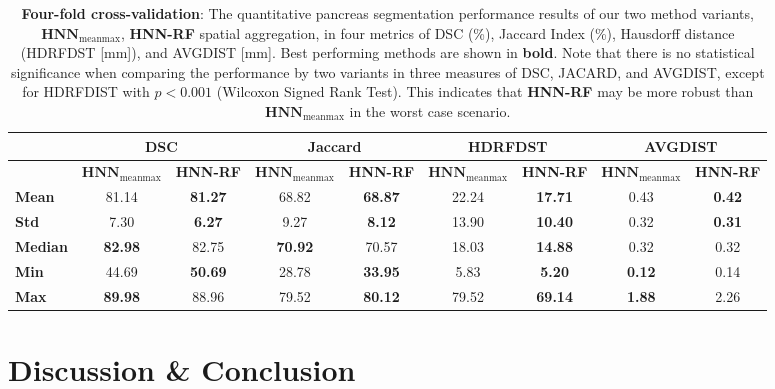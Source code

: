 \documentclass[journal]{IEEEtran}
\begin{document}
\begin{table*}[htb]
\begin{center}
\caption{\small \textbf{Four-fold cross-validation}: The quantitative pancreas segmentation performance results of our two method variants, $\mathbf{HNN}_\mathrm{meanmax}$, \textbf{HNN-RF} spatial aggregation, in four metrics of DSC (\%), Jaccard Index (\%), Hausdorff distance (HDRFDST [mm]), and AVGDIST [mm]. Best performing methods are shown in \textbf{bold}. Note that there is no statistical significance when comparing the performance by two variants in three measures of DSC, JACARD, and AVGDIST, except for HDRFDIST with $p<0.001$ (Wilcoxon Signed Rank Test). This indicates that \textbf{HNN-RF} may be more robust than $\mathbf{HNN}_\mathrm{meanmax}$ in the worst case scenario.}
\label{tab:results2}
\begin{tabular}{l|c|c|c|c|c|c|c|c}
    \toprule
		\toprule
    ~ & \multicolumn{2}{|c|}{DSC} & \multicolumn{2}{|c|}{Jaccard} & \multicolumn{2}{|c|}{HDRFDST}  & \multicolumn{2}{|c|}{AVGDIST} \\
		\midrule 
		~ & $\mathbf{HNN}_\mathrm{meanmax}$ & \textbf{HNN-RF} & $\mathbf{HNN}_\mathrm{meanmax}$ & \textbf{HNN-RF} & $\mathbf{HNN}_\mathrm{meanmax}$ & \textbf{HNN-RF} & $\mathbf{HNN}_\mathrm{meanmax}$ & \textbf{HNN-RF} \\	
		\midrule 	
\textbf{Mean}	    &81.14 & \textbf{81.27}   &68.82 &\textbf{68.87}    &22.24 & \textbf{17.71}   &0.43 & \textbf{0.42}   \\
\textbf{Std}      &7.30  & \textbf{6.27}  	&9.27  &\textbf{8.12}     &13.90 & \textbf{10.40}   &0.32 & \textbf{0.31}  \\
\textbf{Median}   &\textbf{82.98} & 82.75		&\textbf{70.92} &70.57    &18.03 & \textbf{14.88}	  &0.32	&	0.32	\\
\textbf{Min}	    &44.69 & \textbf{50.69} 	&28.78 &\textbf{33.95}    &5.83  & \textbf{5.20}	  &\textbf{0.12}		&0.14 \\
\textbf{Max}	    &\textbf{89.98} & 88.96  	&79.52 &\textbf{80.12}    &79.52 & \textbf{69.14}   &\textbf{1.88}		&2.26 \\
    \bottomrule
		\bottomrule
\end{tabular}\end{center} 
\end{table*}\section{Discussion \& Conclusion}\label{sec:discussion}
\end{document}
